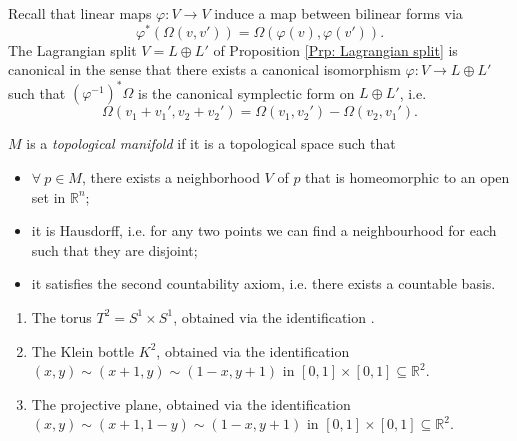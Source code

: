\documentclass[misc]{subfiles}
\begin{document}
\begin{Rmk}\label{Rmk: The Lagrangian split is canonical}
    Recall that linear maps $\varphi:V\to V$ induce a map between bilinear forms via
    \[
    \varphi^\ast(\Omega(v,v')) = \Omega(\varphi(v),\varphi(v')).
    \]
    The Lagrangian split $V=L\oplus L'$ of Proposition \ref{Prp: Lagrangian split} is canonical in the sense that there exists a canonical isomorphism $\varphi:V\to L\oplus L'$ such that $(\varphi^{-1})^\ast\Omega$ is the canonical symplectic form on $L\oplus L'$, i.e.
    \[
    \Omega(v_1+v_1', v_2+v_2') = \Omega(v_1,v_2') - \Omega(v_2,v_1').
    \]

\end{Rmk}

\begin{Dfn}\label{Dfn: Topological manifold}
    $M$ is a \emph{topological manifold} if it is a topological space such that
    \begin{itemize}

        \item $\forall \ p\in M$, there exists a neighborhood $V$ of $p$ that is homeomorphic to an open set in $\mathbb{R}^n$;

        \item it is Hausdorff, i.e. for any two points we can find a neighbourhood for each such that they are disjoint;

        \item it satisfies the second countability axiom, i.e. there exists a countable basis.
    \end{itemize}
\end{Dfn}

\begin{Exp}\leavevmode
    \begin{enumerate}[label=\ExpLbl]

        \item The torus $T^2=S^1\times S^1$, obtained via the identification .

        \item The Klein bottle $K^2$, obtained via the identification $(x,y)\sim (x+1,y)\sim (1-x,y+1)$ in $[0,1]\times[0,1]\subseteq \mathbb{R}^2$.

        \item The projective plane, obtained via the identification $(x,y)\sim (x+1,1-y)\sim (1-x,y+1)$ in $[0,1]\times[0,1]\subseteq \mathbb{R}^2$.
    \end{enumerate}
\end{Exp}
\end{document}
